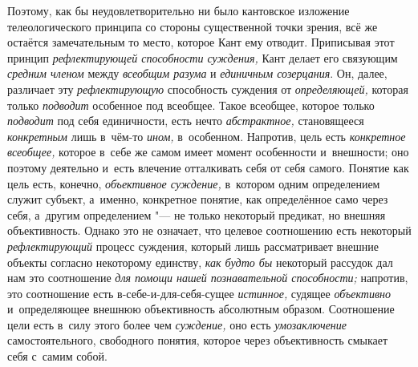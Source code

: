 Поэтому, как бы неудовлетворительно ни было кантовское
изложение телеологического принципа со стороны существенной точки зрения,
всё же остаётся замечательным то место, которое Кант ему отводит.
Приписывая этот принцип {\em рефлектирующей способности суждения,}
Кант делает его связующим {\em средним членом} между {\em всеобщим разума}
и {\em единичным созерцания}. Он, далее, различает эту
{\em рефлектирующую} способность суждения от {\em определяющей,}
которая только {\em подводит} особенное под всеобщее. Такое всеобщее,
которое только {\em подводит} под себя единичности, есть нечто
{\em абстрактное,} становящееся {\em конкретным} лишь в~чём-то {\em ином,}
в~особенном. Напротив, цель есть {\em конкретное всеобщее,}
которое в~себе же самом имеет момент особенности и~внешности;
оно поэтому деятельно и~есть влечение отталкивать себя от себя самого.
Понятие как цель есть, конечно, {\em объективное суждение,}
в~котором одним определением служит субъект, а~именно,
конкретное понятие, как определённое само через себя, а~другим
определением "--- не только некоторый предикат, но внешняя
объективность. Однако это не означает, что целевое соотношению есть
некоторый {\em рефлектирующий} процесс суждения, который лишь рассматривает
внешние объекты согласно некоторому единству, {\em как будто бы} некоторый
рассудок дал нам это соотношение {\em для помощи нашей познавательной
способности;} напротив, это соотношение есть
в-себе-и-для-себя-сущее {\em истинное,} судящее {\em объективно}
и~определяющее внешнюю объективность абсолютным образом.
Соотношение цели есть в~силу этого более чем {\em суждение,} оно есть
{\em умозаключение} самостоятельного, свободного понятия, которое через
объективность смыкает себя с~самим собой.

